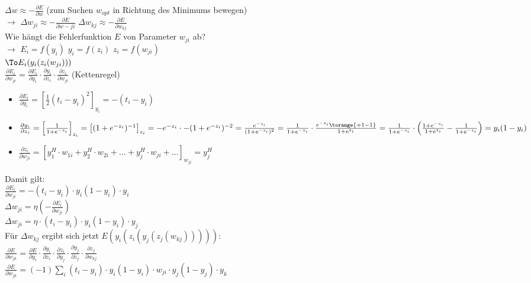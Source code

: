 $\Delta w \approx -\frac{\partial E}{\partial w}$ (zum Suchen $w_{opt}$ in Richtung des Minimums bewegen)\\
$\to$ $\Delta w_{ji}\approx -\frac{\partial E}{\partial w-{ji}}$ \qquad $\Delta w_{kj}\approx - \frac{\partial E}{\partial w_{kj}}$\\
Wie hängt die Fehlerfunktion $E$ von Parameter $w_{ji}$ ab?\\
$\to$ $E_i=f(y_i)$ \quad $y_i=f(z_i)$ \quad $z_i=f(w_{ji})$\\
$\To E_i(y_i(z_i(w_{ji})))$\\
$\frac{\partial E_i}{\partial w_{ji}} = \frac{\partial E_i}{\partial y_i} \cdot \frac{\partial y_i}{\partial z_i} \cdot \frac{\partial z_i}{\partial w_{ji}}$ (Kettenregel)
\begin{itemize}
\item $\frac{\partial E_i}{\partial y_i}=\left[\frac{1}{2}(t_i-y_i)^2\right]_{y_i}=-(t_i -y_i)$
\item $\frac{\partial y_i}{\partial z_i}=\left[ \frac{1}{1+e^{-z_i}}\right]_{z_i}=\left[ (1+e^{-z_i})^{-1}\right]_{z_i}=-e^{-z_i}\cdot -(1+e^{-z_i})^{-2}\\
=\frac{e^{-z_i}}{(1+e^{-z_i})^2}=\frac{1}{1+e^{-z_i}}\cdot\frac{e^{-z_i}\torange{+1-1}}{1+e^{z_i}}=\frac{1}{1+e^{-z_i}}\cdot\left(\frac{1+e^{-z_i}}{1+e^{z_i}}-\frac{1}{1+e^{-z_i}}\right)=y_i(1-y_i)$
\item $\frac{\partial z_i}{\partial w_{ji}}=\left[ y_1^H \cdot w_{1i} + y_2^H \cdot w_{2i} + \ldots + y_j^H \cdot w_{ji} + \ldots \right]_{w_{ji}}=y_j^H$
\end{itemize}
Damit gilt:\\
$\frac{\partial E_i}{\partial w_{ji}}=-(t_i-y_i)\cdot y_i (1-y_i) \cdot y_i$\\
$\boxed{\Delta w_{ji}=\eta \left( - \frac{\partial E_i}{\partial w_{ji}} \right)}$\\
$\boxed{\Delta w_{ji} = \eta \cdot (t_i-y_i) \cdot y_i (1-y_i) \cdot y_j}$\\
Für $\Delta w_{kj}$ ergibt sich jetzt $E(y_i(z_i(y_j(z_j(w_{kj})))))$:\\
$\frac{\partial E}{\partial w_{jk}} = \frac{\partial E}{\partial y_i} \cdot \frac{\partial y_i}{\partial z_i} \cdot \frac{\partial z_i}{\partial y_j}\cdot \frac{\partial y_j}{\partial z_j}\cdot \frac{\partial z_j}{\partial w_{kj}}$\\
$\frac{\partial E}{\partial w_{jk}}= (-1) \sum_i (t_i-y_i) \cdot y_i(1-y_i) \cdot w_{ji} \cdot y_j(1-y_j) \cdot y_k$\\
